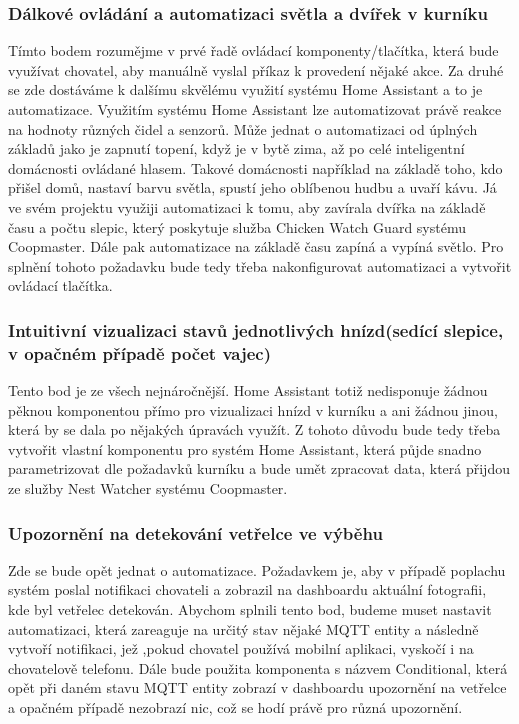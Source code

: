 \subsubsection*{Dálkové ovládání a automatizaci světla a dvířek v kurníku}
Tímto bodem rozumějme v prvé řadě ovládací komponenty/tlačítka, která bude využívat chovatel, aby manuálně vyslal příkaz k provedení nějaké akce.
Za druhé se zde dostáváme k dalšímu skvělému využití systému Home Assistant a to je automatizace.
Využitím systému Home Assistant lze automatizovat právě reakce na hodnoty různých čidel a senzorů.
Může jednat o automatizaci od úplných základů jako je zapnutí topení, když je v bytě zima, až po celé inteligentní domácnosti ovládané hlasem.
Takové domácnosti například na základě toho, kdo přišel domů, nastaví barvu světla, spustí jeho oblíbenou hudbu a uvaří kávu.
Já ve svém projektu využiji automatizaci k tomu, aby zavírala dvířka na základě času a počtu slepic, který poskytuje služba Chicken Watch Guard systému Coopmaster.
Dále pak automatizace na základě času zapíná a vypíná světlo.\newline
Pro splnění tohoto požadavku bude tedy třeba nakonfigurovat automatizaci a vytvořit ovládací tlačítka.

\subsubsection*{Intuitivní vizualizaci stavů jednotlivých hnízd(sedící slepice, v opačném případě počet vajec)}
Tento bod je ze všech nejnáročnější.
Home Assistant totiž nedisponuje žádnou pěknou komponentou přímo pro vizualizaci hnízd v kurníku a ani žádnou jinou, která by se dala po nějakých úpravách využít.\newline
Z tohoto důvodu bude tedy třeba vytvořit vlastní komponentu pro systém Home Assistant, která půjde snadno parametrizovat dle požadavků kurníku a bude umět zpracovat data, která přijdou ze služby Nest Watcher systému Coopmaster.

\subsubsection*{Upozornění na detekování vetřelce ve výběhu}
Zde se bude opět jednat o automatizace.
Požadavkem je, aby v případě poplachu systém poslal notifikaci chovateli a zobrazil na dashboardu aktuální fotografii, kde byl vetřelec detekován.\newline
Abychom splnili tento bod, budeme muset nastavit automatizaci, která zareaguje na určitý stav nějaké MQTT entity a následně vytvoří notifikaci, jež ,pokud chovatel používá mobilní aplikaci, vyskočí i na chovatelově telefonu.
Dále bude použita komponenta s názvem Conditional, která opět při daném stavu MQTT entity zobrazí v dashboardu upozornění na vetřelce a opačném případě nezobrazí nic, což se hodí právě pro různá upozornění.

